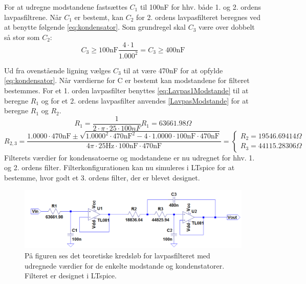 \noindent For at udregne modstandene fastsættes $C_1$ til 100nF for hhv. både 1. og 2. ordens lavpasfiltrene. Når $C_1$ er bestemt, kan $C_2$ for 2. ordens lavpasfilteret beregnes ved at benytte følgende \eqref{eq:kondensator}. Som grundregel skal $C_3$ være over dobbelt så stor som $C_2$:
\begin{equation}  
C_3 \geq 100\text{nF} \frac{4\cdot 1}{1.000^2} = C_3 \geq 400\text{nF}
\end{equation}

\noindent Ud fra ovenstående ligning vælges $C_3$ til at være 470nF for at opfylde \eqref{eq:kondensator}. Når værdierne for C er bestemt kan modstandene for filteret bestemmes. For et 1. orden lavpasfilter benyttes \eqref{eq:Lavpas1Modstande} til at beregne $R_1$ og for et 2. ordens lavpasfilter anvendes \eqref{LavpasModstande} for at beregne $R_1$ og $R_2$. 
\begin{equation} \label{eq:1ordenmodstand}
R_{1} = \frac{1}{2 \cdot \pi \cdot 25 \cdot 100nF} R_{1} = 63661.98 \Omega
\end{equation}
\begin{equation} \label{eq:2ordenmodstand}
R_{2,3} = \frac{1.0000 \cdot 470\text{nF} \pm \sqrt{1.0000^2 \cdot 470\text{nF}^2 - 4 \cdot 1.0000 \cdot 100\text{nF} \cdot 470\text{nF}}}{4 \pi \cdot 25\text{Hz} \cdot 100\text{nF} \cdot 470\text{nF}} = \begin{cases} R_{2} = 19546.69414 \Omega \\ R_{3} =  44115.28306 \Omega \end{cases}
\end{equation}
\noindent Filterets værdier for kondensatoerne og modstandene er nu udregnet for hhv. 1. og 2. ordens filter. Filterkonfigurationen kan nu simuleres i LTspice for at bestemme, hvor godt et 3. ordens filter, der er blevet designet.

\begin{figure}[H]
	\centering
	\includegraphics[scale=0.3]{figures/cProblemloesning/Lavpasfilter1_LTspice.PNG}
	\caption{På figuren ses det teoretiske kredsløb for lavpasfilteret med udregnede værdier for de enkelte modstande og kondenstatorer. Filteret er designet i LTspice.}
	\label{fig:lavpasfilter1_LTspice}
\end{figure}

